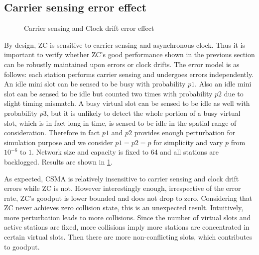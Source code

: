 \documentclass{acm_proc_article-sp}
\begin{document}
\subsection{Carrier sensing error effect}
\begin{figure}[ht]
    \begin{center}
    \caption{Carrier sensing and Clock drift error effect} \label{fig.clockdrift}
    \end{center}
\vspace{-0.2in}
\end{figure}
By design, ZC is sensitive to carrier sensing and asynchronous clock. Thus it is important to verify whether ZC's good performance shown in the previous section can be robustly maintained upon errors or clock drifts. The error model is as follows: each station performs carrier sensing and undergoes errors independently. An idle mini slot can be sensed to be busy with probability $p1$. Also an idle mini slot can be sensed to be idle but counted two times with probability $p2$ due to slight timing mismatch. A busy virtual slot can be sensed to be idle as well with probability $p3$, but it is unlikely to detect the whole portion of a busy virtual slot, which is in fact long in time, is sensed to be idle in the spatial range of consideration. Therefore in fact $p1$ and $p2$ provides enough perturbation for simulation purpose and we consider $p1=p2=p$ for simplicity and vary $p$ from $10^{-6}$ to $1$. Network size and capacity is fixed to 64 and all stations are backlogged. Results are shown in \ref{fig.clockdrift}.

As expected, CSMA is relatively insensitive to carrier sensing and clock drift errors while ZC is not.
However interestingly enough, irrespective of the error rate, ZC's goodput is lower bounded and does not drop to zero. Considering that ZC never achieves zero collision state, this is an unexpected result. Intuitively, more perturbation leads to more collisions. Since the number of virtual slots and active stations are fixed, more collisions imply more stations are concentrated in certain virtual slots. Then there are more non-conflicting slots, which contributes to goodput.
\end{document}
